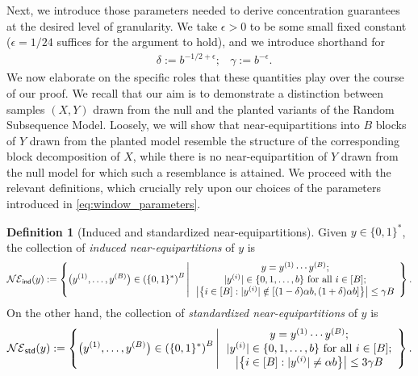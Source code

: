 \documentclass[11pt]{amsart}
\numberwithin{equation}{section}
\numberwithin{equation}{section}
\newcommand{\1}{\mathbbm{1}}
\newcommand{\ind}{\textup{\textsf{ind}}}
\newcommand{\std}{\textup{\textsf{std}}}
\theoremstyle{definition}
\newtheorem{definition}[theorem]{Definition}
\begin{document}
Next, we introduce those parameters needed to derive concentration guarantees at the desired level of granularity. We take $\epsilon > 0$ to be some small fixed constant ($\epsilon = 1/24$ suffices for the argument to hold), and we introduce shorthand for
\begin{align} \label{eq:window_parameters}
    & \delta := b^{-1/2+\epsilon};
    & \gamma := b^{-\epsilon}.
\end{align}
We now elaborate on the specific roles that these quantities play over the course of our proof. We recall that our aim is to demonstrate a distinction between samples $(X,Y)$ drawn from the null and the planted variants of the Random Subsequence Model. Loosely, we will show that near-equipartitions into $B$ blocks of $Y$ drawn from the planted model resemble the structure of the corresponding block decomposition of $X$, while there is no near-equipartition of $Y$ drawn from the null model for which such a resemblance is attained. We proceed with the relevant definitions, which crucially rely upon our choices of the parameters introduced in \eqref{eq:window_parameters}.

\begin{definition}[Induced and standardized near-equipartitions] \label{defn:near_equipartitions}
    Given $y \in \{0,1\}^*$, the collection of \emph{induced near-equipartitions} of $y$ is
    \begin{align*}
        \mathcal{NE}_\ind\!\left( y \right) := \left\{ \big(y^{(1)}, \dots, y^{(B)}\big) \in \left(\{0,1\}^* \right)^B \,\middle|\,
        \begin{array}{c}
            y = y^{(1)}\cdots y^{(B)}; \\ 
            |y^{(i)}| \in \{0,1,\dots,b\} \text{ for all } i \in [B]; \\
            \left| \left\{ i \in [B] : |y^{(i)}| \notin \left[ (1-\delta)\alpha b, (1+\delta)\alpha b \right] \right\} \right| \leq \gamma B
        \end{array} \right\}.
    \end{align*}
    On the other hand, the collection of \emph{standardized near-equipartitions} of $y$ is
    \begin{align*}
        \mathcal{NE}_\std\!\left( y \right) := \left\{ \big(y^{(1)}, \dots, y^{(B)}\big) \in \left(\{0,1\}^* \right)^B \,\middle|\,
        \begin{array}{c}
            y = y^{(1)}\cdots y^{(B)}; \\
            |y^{(i)}| \in \{0,1,\dots,b\} \text{ for all } i \in [B]; \\
            \left| \left\{ i \in [B] : |y^{(i)}| \neq \alpha b \right\} \right| \leq 3\gamma B
        \end{array} \right\}.
    \end{align*}
\end{definition}
\end{document}
